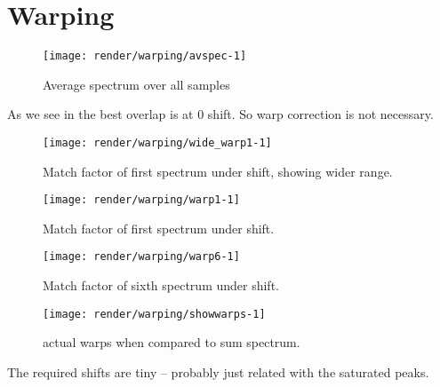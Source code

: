 \section{Warping}


\begin{kframe}


{\ttfamily\noindent\bfseries{}}\end{kframe}

\begin{figure}
\texttt{[image: render/warping/avspec-1]} \caption[Average spectrum over all samples]{Average spectrum over all samples}\label{fig:avspec}
\end{figure}






As we see in  the best overlap is at \num{0} shift.  So warp correction is not necessary.

\begin{figure}
\texttt{[image: render/warping/wide\_warp1-1]} \caption[Match factor of first spectrum under shift, showing wider range]{Match factor of first spectrum under shift, showing wider range.}\label{fig:wide_warp1}
\end{figure}



\begin{figure}
\texttt{[image: render/warping/warp1-1]} \caption[Match factor of first spectrum under shift]{Match factor of first spectrum under shift.}\label{fig:warp1}
\end{figure}



\begin{figure}
\texttt{[image: render/warping/warp6-1]} \caption[Match factor of sixth spectrum under shift]{Match factor of sixth spectrum under shift.}\label{fig:warp6}
\end{figure}





\begin{figure}
\texttt{[image: render/warping/showwarps-1]} \caption[actual warps when compared to sum spectrum]{actual warps when compared to sum spectrum.}\label{fig:showwarps}
\end{figure}



The required shifts are tiny -- probably just related with the saturated peaks.
